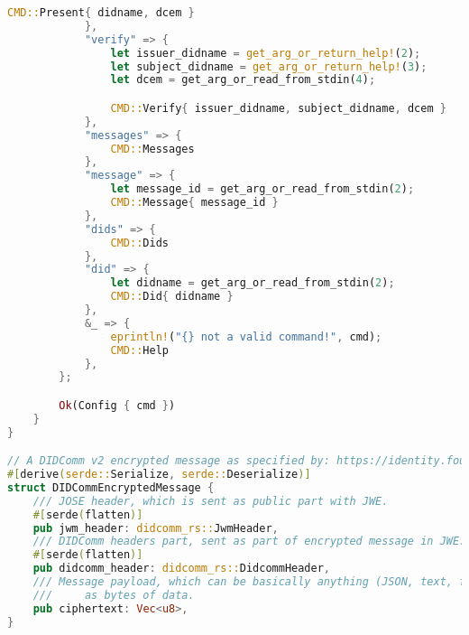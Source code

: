 \begin{lstlisting}[language=Rust]
                CMD::Present{ didname, dcem }
            },
            "verify" => {
                let issuer_didname = get_arg_or_return_help!(2);
                let subject_didname = get_arg_or_return_help!(3);
                let dcem = get_arg_or_read_from_stdin(4);

                CMD::Verify{ issuer_didname, subject_didname, dcem }
            },
            "messages" => {
                CMD::Messages
            },
            "message" => {
                let message_id = get_arg_or_read_from_stdin(2);
                CMD::Message{ message_id }
            },
            "dids" => {
                CMD::Dids
            },
            "did" => {
                let didname = get_arg_or_read_from_stdin(2);
                CMD::Did{ didname }
            },
            &_ => {
                eprintln!("{} not a valid command!", cmd);
                CMD::Help
            },
        };

        Ok(Config { cmd })
    }
}

// A DIDComm v2 encrypted message as specified by: https://identity.foundation/didcomm-messaging/spec/#didcomm-encrypted-message
#[derive(serde::Serialize, serde::Deserialize)]
struct DIDCommEncryptedMessage {
    /// JOSE header, which is sent as public part with JWE.
    #[serde(flatten)]
    pub jwm_header: didcomm_rs::JwmHeader,
    /// DIDComm headers part, sent as part of encrypted message in JWE.
    #[serde(flatten)]
    pub didcomm_header: didcomm_rs::DidcommHeader,
    /// Message payload, which can be basically anything (JSON, text, file, etc.) represented
    ///     as bytes of data.
    pub ciphertext: Vec<u8>,
}

\end{lstlisting}
